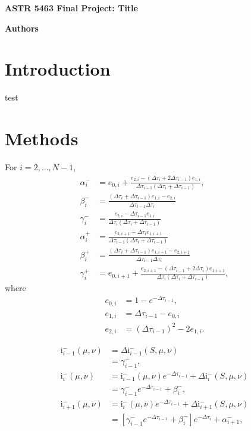 \documentclass[12pt]{article}
\begin{document}
\begin{center}\begin{LARGE}
\textbf{ASTR 5463 Final Project: Title}
\end{LARGE}\end{center}

\begin{center}
\textbf{Authors}
\end{center}

\section{Introduction}

test

\section{Methods}

For $i = 2, ..., N - 1$,
\begin{align*}
\alpha_i^-
&=
e_{0, i} +
\frac{e_{2, i} - (\Delta\tau_i + 2\Delta\tau_{i - 1}) e_{1, i}}
     {\Delta\tau_{i - 1} (\Delta\tau_i + \Delta\tau_{i - 1})},
\\ \beta_i^-
&=
\frac{(\Delta\tau_i + \Delta\tau_{i - 1}) e_{1, i} - e_{2, i}}
     {\Delta\tau_{i - 1} \Delta\tau_i}
\\ \gamma_i^-
&=
\frac{e_{2, i} - \Delta\tau_{i - 1} e_{1, i}}
     {\Delta\tau_i (\Delta\tau_i + \Delta\tau_{i - 1})}
\\ \alpha_i^+
&=
\frac{e_{2, i + 1} - \Delta\tau_i e_{1, i + 1}}
     {\Delta\tau_{i - 1} (\Delta\tau_i + \Delta\tau_{i - 1})}
\\ \beta_i^+
&=
\frac{(\Delta\tau_i + \Delta\tau_{i - 1}) e_{1, i + 1} - e_{2, i + 1}}
     {\Delta\tau_{i - 1} \Delta\tau_i}
\\ \gamma_i^+
&=
e_{0, i + 1} +
\frac{e_{2, i + 1} - (\Delta\tau_{i - 1} + 2\Delta\tau_i) e_{1, i + 1}}
     {\Delta\tau_i (\Delta\tau_i + \Delta\tau_{i - 1})},
\end{align*}
where
\begin{align*}
e_{0, i}
&=
1 - e^{-\Delta\tau_{i - 1}},
\\ e_{1, i}
&=
\Delta\tau_{i - 1} - e_{0, i}
\\ e_{2, i}
&=
(\Delta\tau_{i - 1})^2 - 2 e_{1, i}.
\end{align*}

\begin{align*}
\text{i}_{i - 1}^- (\mu, \nu)
&=
\Delta\text{i}_{i - 1}^- (S, \mu, \nu)
\\ &=
\gamma_{i - 1}^-,
\\ \text{i}_{i}^- (\mu, \nu)
&=
\text{i}_{i - 1}^- (\mu, \nu) e^{-\Delta\tau_{i - 1}} +
    \Delta\text{i}_{i}^- (S, \mu, \nu)
\\ &=
\gamma_{i - 1}^- e^{-\Delta\tau_{i - 1}} + \beta_{i}^-,
\\ \text{i}_{i + 1}^- (\mu, \nu)
&=
\text{i}_{i}^- (\mu, \nu) e^{-\Delta\tau_{i - 1}} +
    \Delta\text{i}_{i + 1}^- (S, \mu, \nu)
\\ &=
[\gamma_{i - 1}^- e^{-\Delta\tau_{i - 1}} + \beta_{i}^-] e^{-\Delta\tau_{i}} +
    \alpha_{i + 1}^-,
\end{align*}
\end{document}
